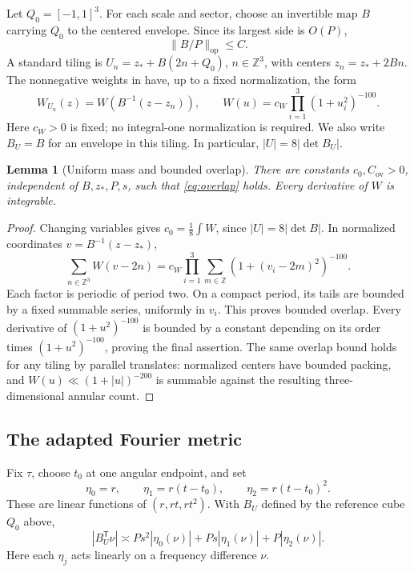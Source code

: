 \documentclass[11pt,reqno]{amsart}
\numberwithin{equation}{section}
\newtheorem{lemma}[lemma]{Lemma}
\theoremstyle{definition}
\theoremstyle{remark}
\newcommand{\Z}{\mathbb Z}
\begin{document}
Let $Q_0=[-1,1]^3$. For each scale and sector, choose an invertible map $B$ carrying $Q_0$ to the centered envelope. Since its largest side is $O(P)$,
\begin{equation}\label{eq:Bbound}
 \|B/P\|_{\mathrm{op}}\le C.
\end{equation}
A standard tiling is $U_n=z_*+B(2n+Q_0)$, $n\in\Z^3$, with centers $z_n=z_*+2Bn$.
The nonnegative weights in \cite[(13), Section~5]{GM} have, up to a fixed normalization, the form
\begin{equation}\label{eq:actualweight}
 W_{U_n}(z)=W(B^{-1}(z-z_n)),\qquad
 W(u)=c_W\prod_{i=1}^3(1+u_i^2)^{-100}.
\end{equation}
Here $c_W>0$ is fixed; no integral-one normalization is required. We also write $B_U=B$ for an envelope in this tiling. In particular, $|U|=8|\det B_U|$.

\begin{lemma}[Uniform mass and bounded overlap]\label{lem:overlap}
There are constants $c_0,C_{\mathrm{ov}}>0$, independent of $B,z_*,P,s$, such that
\eqref{eq:overlap} holds.
Every derivative of $W$ is integrable.
\end{lemma}
\begin{proof}
Changing variables gives $c_0=\frac18\int W$, since $|U|=8|\det B|$.
In normalized coordinates $v=B^{-1}(z-z_*)$,
\[
 \sum_{n\in\Z^3}W(v-2n)
 =c_W\prod_{i=1}^3\sum_{m\in\Z}(1+(v_i-2m)^2)^{-100}.
\]
Each factor is periodic of period two. On a compact period, its tails are bounded by a fixed summable series, uniformly in $v_i$. This proves bounded overlap. Every derivative of $(1+u^2)^{-100}$ is bounded by a constant depending on its order times $(1+u^2)^{-100}$, proving the final assertion.
The same overlap bound holds for any tiling by parallel translates: normalized centers have bounded packing, and $W(u)\ll(1+|u|)^{-200}$ is summable against the resulting three-dimensional annular count.
\end{proof}

\subsection{The adapted Fourier metric}
Fix $\tau$, choose $t_0$ at one angular endpoint, and set
\begin{equation}\label{eq:etacoordinates}
 \eta_0=r,\qquad\eta_1=r(t-t_0),\qquad\eta_2=r(t-t_0)^2.
\end{equation}
These are linear functions of $(r,rt,rt^2)$.
With $B_U$ defined by the reference cube $Q_0$ above,
\begin{equation}\label{eq:dualmetric}
 |B_U^{\mathsf T}\nu|\asymp
 Ps^2|\eta_0(\nu)|+Ps|\eta_1(\nu)|+P|\eta_2(\nu)|.
\end{equation}
Here each $\eta_j$ acts linearly on a frequency difference $\nu$.
\end{document}
